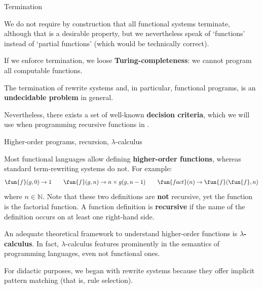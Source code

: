 %
\begin{frame}{Termination}

  \label{termination2}

  We do not require by construction that all functional systems
  terminate, although that is a desirable property, but we
  nevertheless speak of `functions' instead of `partial functions'
  (which would be technically correct).

  \bigskip

  If we enforce termination, we loose
  \textbf{Turing\hyp{}completeness}: we cannot program all computable
  functions.

  \bigskip

  The termination of rewrite systems and, in particular, functional
  programs, is an \textbf{undecidable problem} in general.

  \bigskip

  Nevertheless, there exists a set of well\hyp{}known \textbf{decision
    criteria}, which we will use when programming recursive functions
  in \OCaml.

\end{frame}

%
\begin{frame}{Higher-order programs, recursion, $\lambda$-calculus}

  Most functional languages allow defining \textbf{higher\hyp{}order
    functions}, whereas standard term\hyp{}rewriting systems do
  not. For example:
  \begin{equation*}
    \fun{f}(g,0) \rightarrow 1
    \qquad
    \fun{f}(g,n) \rightarrow n \times g(g,n-1)
    \qquad
    \fun{fact}(n) \rightarrow \fun{f}(\fun{f},n)
  \end{equation*}
  where \(n \in \mathbb{N}\). Note that these two definitions are
  \textbf{not} recursive, yet the function  is the factorial
  function. A function definition is \textbf{recursive} if the name of
  the definition occurs on at least one right\hyp{}hand side.

  \bigskip

  An adequate theoretical framework to understand higher\hyp{}order
  functions is \textbf{\(\lambda\)-calculus}. In fact,
  \(\lambda\)-calculus features prominently in the semantics of
  programming languages, even not functional ones.

  \bigskip

  For didactic purposes, we began with rewrite systems because they
  offer implicit pattern matching (that is, rule selection).

\end{frame}
